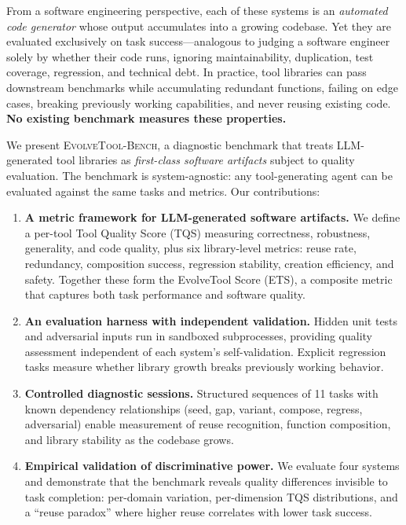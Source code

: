 \documentclass[10pt,twocolumn]{article}
\begin{document}
From a software engineering perspective, each of these systems is an \emph{automated code generator} whose output accumulates into a growing codebase. Yet they are evaluated exclusively on task success---analogous to judging a software engineer solely by whether their code runs, ignoring maintainability, duplication, test coverage, regression, and technical debt. In practice, tool libraries can pass downstream benchmarks while accumulating redundant functions, failing on edge cases, breaking previously working capabilities, and never reusing existing code. \textbf{No existing benchmark measures these properties.}

We present \textsc{EvolveTool-Bench}, a diagnostic benchmark that treats LLM-generated tool libraries as \emph{first-class software artifacts} subject to quality evaluation. The benchmark is system-agnostic: any tool-generating agent can be evaluated against the same tasks and metrics. Our contributions:

\begin{enumerate}
\item \textbf{A metric framework for LLM-generated software artifacts.} We define a per-tool Tool Quality Score (TQS) measuring correctness, robustness, generality, and code quality, plus six library-level metrics: reuse rate, redundancy, composition success, regression stability, creation efficiency, and safety. Together these form the EvolveTool Score (ETS), a composite metric that captures both task performance and software quality.

\item \textbf{An evaluation harness with independent validation.} Hidden unit tests and adversarial inputs run in sandboxed subprocesses, providing quality assessment independent of each system's self-validation. Explicit regression tasks measure whether library growth breaks previously working behavior.

\item \textbf{Controlled diagnostic sessions.} Structured sequences of 11 tasks with known dependency relationships (seed, gap, variant, compose, regress, adversarial) enable measurement of reuse recognition, function composition, and library stability as the codebase grows.

\item \textbf{Empirical validation of discriminative power.} We evaluate four systems and demonstrate that the benchmark reveals quality differences invisible to task completion: per-domain variation, per-dimension TQS distributions, and a ``reuse paradox'' where higher reuse correlates with lower task success.
\end{enumerate}
\end{document}

